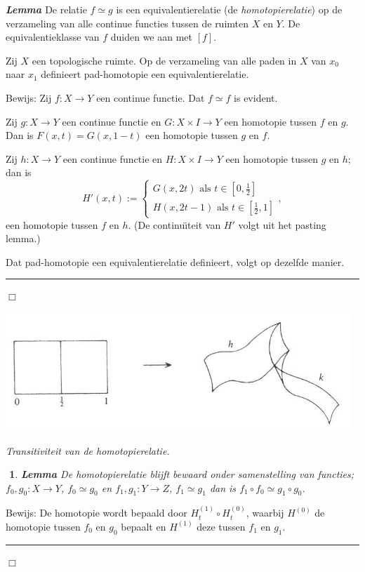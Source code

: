 \documentclass[12pt]{book}
\newcommand{\bew}{{\sc Bewijs: }}
\newcommand{\B}{\rule{1mm}{0mm} \hfill $\Box$ }
\newenvironment{lem}{\begin{lemh}{\em {\bf Lemma }}}{\end{lemh}}
\newtheorem{eigh}[stelh]{$\!\!$}
\newenvironment{eig}{\begin{eigh}{\em {\bf Lemma }}}{\end{eigh}}
\begin{document}
\begin{lem} De relatie $f\simeq g$ is een equivalentierelatie (de {\em homotopierelatie}) op de
verzameling van alle continue functies tussen de ruimten $X$ en $Y$. De equivalentieklasse van $f$
duiden we aan met $[f]$.

Zij $X$ een topologische ruimte. Op de verzameling van alle paden in $X$ van $x_0$ naar $x_1$ definieert pad-homotopie een equivalentierelatie.
\end{lem}
\bew Zij $f: X\to Y$ een continue functie. 
Dat $f\simeq f$ is evident. 

Zij $g:X\to Y$ een continue functie en $G:X\times I \to Y$ een homotopie tussen $f$ en $g$. Dan is
$F(x,t)=G(x, 1-t)$ een homotopie tussen $g$ en $f$.

Zij $h: X\to Y$ een continue functie en $H:X\times I \to Y$ een homotopie tussen $g$ en $h$; dan is
$$H'(x,t):=\left\{\begin{array}{l} G(x,2t) \mbox{ als } t\in [0, \frac{1}{2}] \\
H(x, 2t-1) \mbox{ als } t\in [\frac{1}{2}, 1]\end{array}\right.,$$
een homotopie tussen $f$ en $h$. (De continu\"{\i}teit van $H'$ volgt uit het pasting lemma.) 

Dat pad-homotopie een equivalentierelatie definieert, volgt op dezelfde manier.  
\B  

\begin{center}
\includegraphics[width=13cm]{images/transitief.JPG}

\vspace{3mm}
{\em Transitiviteit van de homotopierelatie.}
\end{center}

\begin{eig} De homotopierelatie blijft bewaard onder samenstelling van functies; $f_0, g_0:X\to Y$,
$f_0\simeq g_0$ en $f_1, g_1:Y\to Z$, $f_1\simeq g_1$ dan is $f_1\circ f_0\simeq g_1 \circ g_0$.
\end{eig}

\bew De homotopie wordt bepaald door $H_{t}^{(1)}\circ H_{t}^{(0)}$, waarbij $H^{(0)}$ de homotopie tussen $f_0$ en $g_0$ bepaalt en $H^{(1)}$ deze tussen $f_1$ en $g_1$. \B
\end{document}
